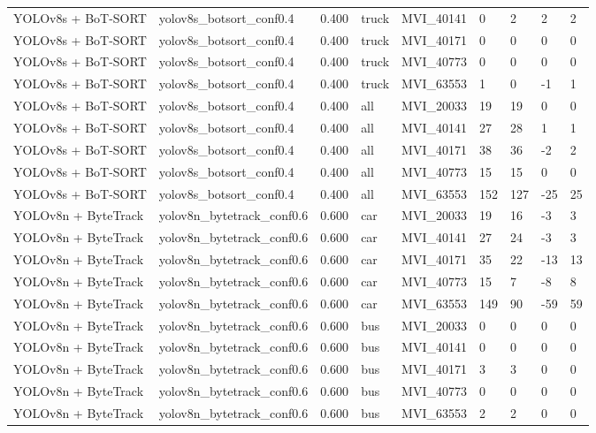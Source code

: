 \begin{tabular}{lllllllll}
YOLOv8s + BoT-SORT & yolov8s\_botsort\_conf0.4 & 0.400 & truck & MVI\_40141 & 0 & 2 & 2 & 2 \\
YOLOv8s + BoT-SORT & yolov8s\_botsort\_conf0.4 & 0.400 & truck & MVI\_40171 & 0 & 0 & 0 & 0 \\
YOLOv8s + BoT-SORT & yolov8s\_botsort\_conf0.4 & 0.400 & truck & MVI\_40773 & 0 & 0 & 0 & 0 \\
YOLOv8s + BoT-SORT & yolov8s\_botsort\_conf0.4 & 0.400 & truck & MVI\_63553 & 1 & 0 & -1 & 1 \\
YOLOv8s + BoT-SORT & yolov8s\_botsort\_conf0.4 & 0.400 & all & MVI\_20033 & 19 & 19 & 0 & 0 \\
YOLOv8s + BoT-SORT & yolov8s\_botsort\_conf0.4 & 0.400 & all & MVI\_40141 & 27 & 28 & 1 & 1 \\
YOLOv8s + BoT-SORT & yolov8s\_botsort\_conf0.4 & 0.400 & all & MVI\_40171 & 38 & 36 & -2 & 2 \\
YOLOv8s + BoT-SORT & yolov8s\_botsort\_conf0.4 & 0.400 & all & MVI\_40773 & 15 & 15 & 0 & 0 \\
YOLOv8s + BoT-SORT & yolov8s\_botsort\_conf0.4 & 0.400 & all & MVI\_63553 & 152 & 127 & -25 & 25 \\
YOLOv8n + ByteTrack & yolov8n\_bytetrack\_conf0.6 & 0.600 & car & MVI\_20033 & 19 & 16 & -3 & 3 \\
YOLOv8n + ByteTrack & yolov8n\_bytetrack\_conf0.6 & 0.600 & car & MVI\_40141 & 27 & 24 & -3 & 3 \\
YOLOv8n + ByteTrack & yolov8n\_bytetrack\_conf0.6 & 0.600 & car & MVI\_40171 & 35 & 22 & -13 & 13 \\
YOLOv8n + ByteTrack & yolov8n\_bytetrack\_conf0.6 & 0.600 & car & MVI\_40773 & 15 & 7 & -8 & 8 \\
YOLOv8n + ByteTrack & yolov8n\_bytetrack\_conf0.6 & 0.600 & car & MVI\_63553 & 149 & 90 & -59 & 59 \\
YOLOv8n + ByteTrack & yolov8n\_bytetrack\_conf0.6 & 0.600 & bus & MVI\_20033 & 0 & 0 & 0 & 0 \\
YOLOv8n + ByteTrack & yolov8n\_bytetrack\_conf0.6 & 0.600 & bus & MVI\_40141 & 0 & 0 & 0 & 0 \\
YOLOv8n + ByteTrack & yolov8n\_bytetrack\_conf0.6 & 0.600 & bus & MVI\_40171 & 3 & 3 & 0 & 0 \\
YOLOv8n + ByteTrack & yolov8n\_bytetrack\_conf0.6 & 0.600 & bus & MVI\_40773 & 0 & 0 & 0 & 0 \\
YOLOv8n + ByteTrack & yolov8n\_bytetrack\_conf0.6 & 0.600 & bus & MVI\_63553 & 2 & 2 & 0 & 0 \\

\end{tabular}

